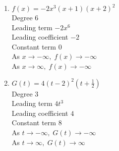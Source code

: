 \pagebreak

\begin{multicols}{2}
\begin{enumerate}
\setcounter{enumi}{\value{HW}}

\item $f(x) = -2x^3(x+1)(x+2)^2$ \\
Degree 6 \\
Leading term $-2x^{6}$\\
Leading coefficient $-2$\\
Constant term $0$\\
As $x \rightarrow -\infty, \; f(x) \rightarrow -\infty$\\
As $x \rightarrow \infty, \; f(x) \rightarrow -\infty$\\

\item $G(t) = 4(t-2)^2\left(t+\frac{1}{2}\right)$ \\
Degree 3 \\
Leading term $4t^3$\\
Leading coefficient $4$\\
Constant term $8$\\
As $t \rightarrow -\infty, \; G(t) \rightarrow -\infty$\\
As $t \rightarrow \infty, \; G(t) \rightarrow \infty$\\

\setcounter{HW}{\value{enumi}}
\end{enumerate}
\end{multicols}

